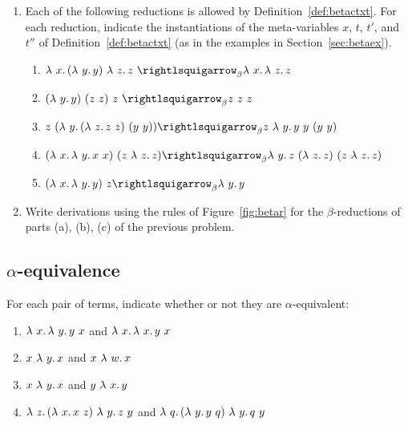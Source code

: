 \begin{enumerate}
  \item Each of the following reductions is allowed by Definition~\ref{def:betactxt}.  For each reduction, indicate the instantiations of the meta-variables $x$, $t$, $t'$, and $t''$ of Definition~\ref{def:betactxt} (as in the examples in Section~\ref{sec:betaex}).
    \begin{enumerate}
    \item $\lam{x}{(\lam{y}{y})\ \lam{z}{z}}\ \betar \lam{x}{\lam{z}{z}}$
      \vspace{.5cm}
    \item $(\lam{y}{y})\ (z\ z)\ z\ \betar z\ z\ z$
      \vspace{.5cm}
    \item $z\ (\lam{y}{(\lam{z}{z\ z})\ (y\ y)}) \betar z\ \lam{y}{y\ y\ (y\ y)}$
      \vspace{.5cm}
    \item $(\lam{x}{\lam{y}{x\ x}})\ (z\ \lam{z}{z}) \betar \lam{y}{z\ (\lam{z}{z})\ (z\ \lam{z}{z})}$
      \vspace{.5cm}
    \item $(\lam{x}{\lam{y}{y}})\ z \betar \lam{y}{y}$
      \vspace{.5cm}
    \end{enumerate}

  \item Write derivations using the rules of Figure~\ref{fig:betar} for the $\beta$-reductions of parts (a), (b), (c) of the previous problem.

   \end{enumerate}

\subsection{$\alpha$-equivalence}

For each pair of terms, indicate whether or not they are $\alpha$-equivalent:
\begin{enumerate}
\item $\lambda\ x.\, \lambda\ y.\, y\ x$ and $\lambda\ x.\, \lambda\ x.\, y\ x$
  \vspace{.5cm}
\item $x\ \lambda\ y.\, x$ and $x\ \lambda\ w.\, x$
  \vspace{.5cm}
\item $x\ \lambda\ y.\, x$ and $y\ \lambda\ x.\, y$
  \vspace{.5cm}
\item $\lam{z}{(\lam{x}{x\ z})\ \lam{y}{z\ y}}$ and $\lam{q}{(\lam{y}{y\ q})\ \lam{y}{q\ y}}$
  \vspace{.5cm}
\end{enumerate}

